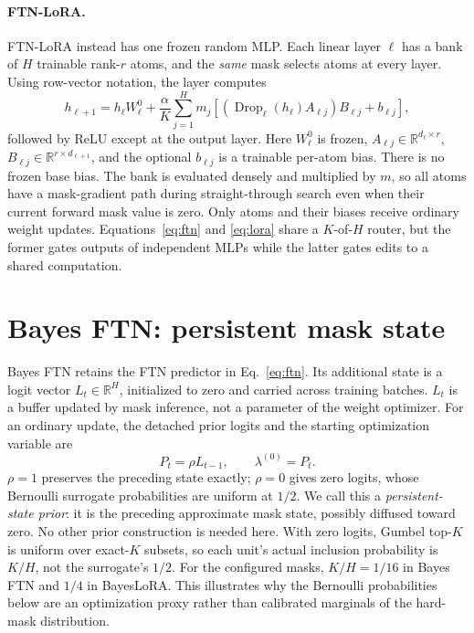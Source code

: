 \documentclass[11pt]{article}
\begin{document}
\paragraph{FTN-LoRA.}
FTN-LoRA instead has one frozen random MLP. Each linear layer $\ell$ has a
bank of $H$ trainable rank-$r$ atoms, and the \emph{same} mask selects atoms
at every layer. Using row-vector notation, the layer computes
\begin{equation}
 h_{\ell+1}=h_\ell W^0_\ell+
 \frac{\alpha}{K}\sum_{j=1}^{H}m_j
 \left[(\operatorname{Drop}_\ell(h_\ell)A_{\ell j})B_{\ell j}
       +b_{\ell j}\right],
 \label{eq:lora}
\end{equation}
followed by ReLU except at the output layer. Here $W^0_\ell$ is frozen,
$A_{\ell j}\in\mathbb{R}^{d_\ell\times r}$,
$B_{\ell j}\in\mathbb{R}^{r\times d_{\ell+1}}$, and the optional
$b_{\ell j}$ is a trainable per-atom bias. There is no frozen base bias.
The bank is evaluated densely and multiplied by $m$, so all atoms have a
mask-gradient path during straight-through search even when their current
forward mask value is zero. Only atoms and their biases receive ordinary
weight updates. Equations~\eqref{eq:ftn} and \eqref{eq:lora} share a $K$-of-$H$
router, but the former gates outputs of independent MLPs while the latter
gates edits to a shared computation.

\section{Bayes FTN: persistent mask state}
Bayes FTN retains the FTN predictor in Eq.~\eqref{eq:ftn}. Its additional
state is a logit vector $L_t\in\mathbb{R}^{H}$, initialized to zero and
carried across training batches. $L_t$ is a buffer updated by mask inference,
not a parameter of the weight optimizer. For an ordinary update, the detached
prior logits and the starting optimization variable are
\begin{equation}
 P_t=\rho L_{t-1},\qquad \lambda^{(0)}=P_t.
 \label{eq:prior}
\end{equation}
$\rho=1$ preserves the preceding state exactly; $\rho=0$ gives zero logits,
whose Bernoulli surrogate probabilities are uniform at $1/2$. We call this
a \emph{persistent-state prior}: it is the preceding approximate mask state,
possibly diffused toward zero. No other prior construction is needed here.
With zero logits, Gumbel top-$K$ is uniform over exact-$K$ subsets, so each
unit's actual inclusion probability is $K/H$, not the surrogate's $1/2$.
For the configured masks, $K/H=1/16$ in Bayes FTN and $1/4$ in BayesLoRA.
This illustrates why the Bernoulli probabilities below are an optimization
proxy rather than calibrated marginals of the hard-mask distribution.
\end{document}
